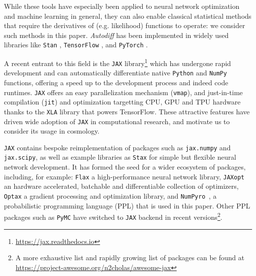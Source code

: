 \documentclass[twocolumn,twocolappendix,nofootinbib,iop]{openjournal}
\newcommand{\numpyro}{\texttt{NumPyro}}
\begin{document}
While these tools have especially been applied to neural network optimization and machine learning in general, they can also enable classical statistical methods that require the derivatives of (e.g. likelihood) functions to operate: we consider such methods in this paper. \textit{Autodiff} has been implemented in widely used libraries like \texttt{Stan} \citep{JSSv076i01}, \texttt{TensorFlow}  \citep{tensorflow2015-whitepaper}, and  \texttt{PyTorch} \citep{NEURIPS2019_9015}. 

A recent entrant to this field is the \texttt{JAX} library\footnote{\url{https://jax.readthedocs.io}} \citep{jax2018github} which has undergone rapid development and can automatically differentiate native \texttt{Python} and \texttt{NumPy} functions, offering a speed up to the development process and indeed code runtimes. \texttt{JAX} offers an easy parallelization mechanism (\texttt{vmap}), and just-in-time compilation (\texttt{jit}) and optimization targetting CPU, GPU and TPU hardware thanks to the \texttt{XLA} library that powers TensorFlow. These attractive features have driven wide adoption of \texttt{JAX} in computational research, and motivate us to consider its usage in cosmology.

\texttt{JAX} contains bespoke reimplementation of packages such as \texttt{jax.numpy} and \texttt{jax.scipy}, as well as example libraries as \texttt{Stax} for simple but flexible neural network development. It has formed the seed for a wider ecosystem of packages, including, for example: 
\texttt{Flax} \citep{flax2020github} a high-performance neural network library, \texttt{JAXopt} \citep{jaxopt_implicit_diff} an hardware accelerated, batchable and differentiable collection of optimizers, \texttt{Optax} \citep{optax2020github} a gradient processing and optimization library, and \numpyro\ \citep{phan2019composable,bingham2019pyro}, a probabilistic programming language (PPL) that is used in this paper. Other PPL packages such as \texttt{PyMC} \citep{Salvatier2016} have switched to \texttt{JAX} backend in recent versions\footnote{A more exhaustive list and rapidly growing list of packages can be found at \url{https://project-awesome.org/n2cholas/awesome-jax}}.

\end{document}
